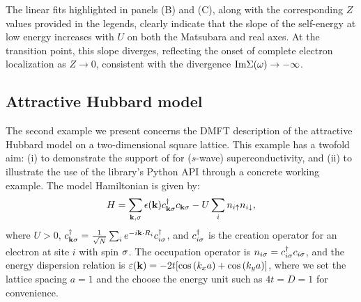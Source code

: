 \documentclass[edipack2.tex]{subfiles}
\begin{document}
The linear fits highlighted in panels (B) and (C), along with the 
corresponding $Z$ values provided in the legends, clearly indicate that 
the slope of the self-energy at low energy increases with $U$ on both 
the Matsubara and real axes. At the transition point, this slope 
diverges, reflecting the onset of complete electron localization as 
$Z \to 0$, consistent with the divergence 
${\rm Im}\Sigma(\omega) \rightarrow -\infty$.






















\subsection{Attractive Hubbard model}\label{SecExamplesAHM}
The second example we present concerns the DMFT description of the 
attractive Hubbard model on a two-dimensional square lattice. This 
example has a twofold aim: (i) to demonstrate the support of \NAME 
for ($s$-wave) superconductivity, and (ii) to illustrate the use of 
the library's Python API through a concrete working example. The 
model Hamiltonian is given by:
$$
H = \sum_{{\bf k},\sigma} \epsilon({\bf k}) c^\dagger_{{\bf k}\sigma} c_{{\bf k}\sigma} 
    - U \sum_i n_{i\uparrow} n_{i\downarrow},
$$
where $U > 0$, $c^\dagger_{{\bf k}\sigma} = \tfrac{1}{\sqrt{N}} 
\sum_i e^{-i{\bf k} \cdot R_i} c^\dagger_{i\sigma}$, and $c^\dagger_{i\sigma}$ 
is the creation operator for an electron at site $i$ with spin $\sigma$. 
The occupation operator is $n_{i\sigma} = c^\dagger_{i\sigma} c_{i\sigma}$, and 
the energy dispersion relation is $\varepsilon({\bf k})=-2t[\cos{(k_x a)}+
\cos{(k_y a)}]$, where we set the lattice spacing 
$a=1$  and the choose the energy unit such as $4t=D=1$ for convenience.
\end{document}

